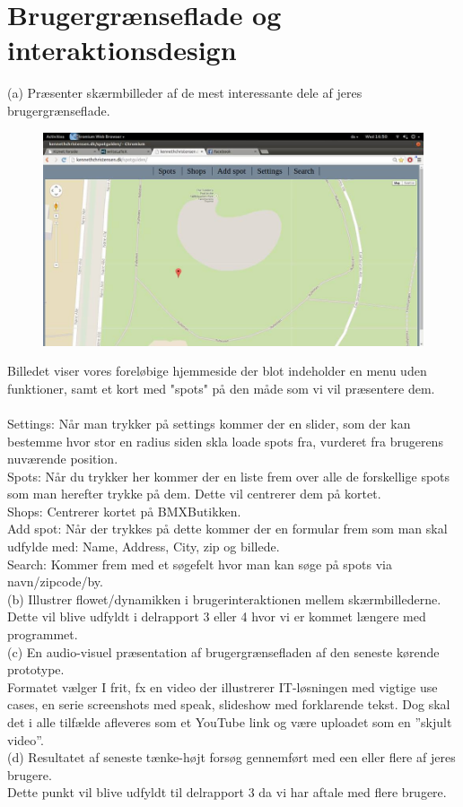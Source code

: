 \documentclass[12pt]{article}
\begin{document}
\pagebreak
\section{Brugergrænseflade og interaktionsdesign}
(a) Præsenter skærmbilleder af de mest interessante dele af jeres brugergrænseflade.

\begin{figure}[h]
\includegraphics[scale = 0.3]{screen1}
\end{figure}

Billedet viser vores foreløbige hjemmeside der blot indeholder en menu uden funktioner, samt et kort med "spots" på den måde som vi vil præsentere dem. \\ \\
Settings: Når man trykker på settings kommer der en slider, som der kan bestemme hvor stor en radius siden skla loade spots fra, vurderet fra brugerens nuværende position.\\
Spots: Når du trykker her kommer der en liste frem over alle de forskellige spots som man herefter trykke på dem. Dette vil centrerer dem på kortet.\\
Shops: Centrerer kortet på BMXButikken.\\
Add spot: Når der trykkes på dette kommer der en formular frem som man skal udfylde med: Name, Address, City, zip og billede.\\
Search: Kommer frem med et søgefelt hvor man kan søge på spots via navn/zipcode/by.\\

(b) Illustrer flowet/dynamikken i brugerinteraktionen mellem skærmbillederne.\\
Dette vil blive udfyldt i delrapport 3 eller 4 hvor vi er kommet længere med programmet.\\
(c) En audio-visuel præsentation af brugergrænsefladen af den seneste kørende prototype.\\
Formatet vælger I frit, fx en video der illustrerer IT-løsningen med vigtige use cases, en serie
screenshots med speak, slideshow med forklarende tekst. Dog skal det i alle tilfælde afleveres som
et YouTube link og være uploadet som en ”skjult video”.\\
(d) Resultatet af seneste tænke-højt forsøg gennemført med een eller flere af jeres brugere.\\
Dette punkt vil blive udfyldt til delrapport 3 da vi har aftale med flere brugere.\\
\end{document}
